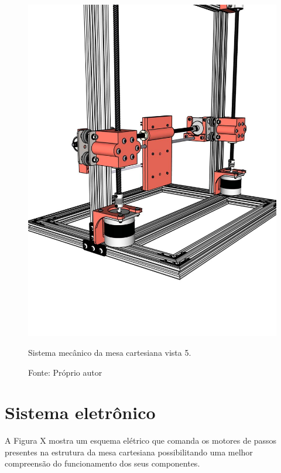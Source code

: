 \begin{figure}[H]
\centering
\includegraphics[scale = 0.45]{figuras/mesacartesiana05}
\caption{Sistema mecânico da mesa cartesiana vista 5.}
\caption*{Fonte: Próprio autor}
\label{fig:mesacartesiana05}
\end{figure}


\section{Sistema eletrônico}\label{sec:ressisele}

A Figura X mostra um esquema elétrico que comanda os motores de passos presentes na estrutura  da mesa 
cartesiana possibilitando uma melhor compreensão do funcionamento dos seus componentes.


